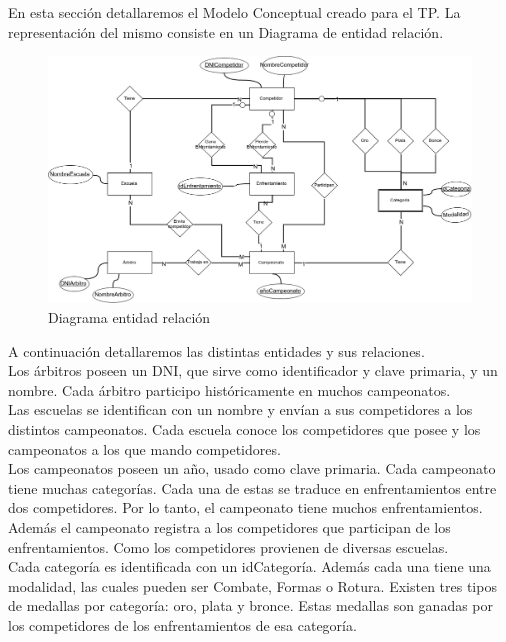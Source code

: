 En esta sección detallaremos el Modelo Conceptual creado para el TP. La representación del mismo consiste en un Diagrama
de entidad relación.

\begin{figure}[H]
  \centering
    \includegraphics[scale=0.4]{imagenes/DER.png}
  \caption{Diagrama entidad relación}
\end{figure}

A continuación detallaremos las distintas entidades y sus relaciones.\\

Los árbitros poseen un DNI, que sirve como identificador y clave primaria, y un nombre. Cada árbitro participo históricamente
en muchos campeonatos.\\

Las escuelas se identifican con un nombre y envían a sus competidores a los distintos campeonatos. Cada escuela conoce los competidores
que posee y los campeonatos a los que mando competidores.\\

Los campeonatos poseen un año, usado como clave primaria. Cada campeonato tiene muchas categorías. Cada una de estas se
traduce en enfrentamientos entre dos competidores. Por lo tanto, el campeonato tiene muchos enfrentamientos. Además
el campeonato registra a los competidores que participan de los enfrentamientos. Como los competidores provienen de
diversas escuelas.\\

Cada categoría es identificada con un idCategoría. Además cada una tiene una modalidad, las cuales pueden ser
Combate, Formas o Rotura. Existen tres tipos de medallas por categoría: oro, plata y bronce. Estas medallas son ganadas
por los competidores de los enfrentamientos de esa categoría.\\


